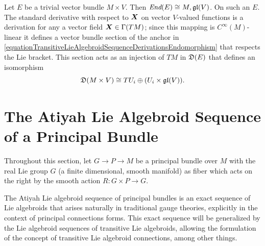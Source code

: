 \begin{example}
\label{exampleDerivationsLieAlgebroidOfATrivialVectorBundleglV}
Let $E$ be a trivial vector bundle $M \times V$. Then $\operatorname{\textit{End}}(E) \cong M, \mathfrak{gl}(V)$. On such an $E$. The standard derivative with respect to $\bm{X}$ on vector $V$-valued functions is a derivation for any a vector field $\bm{X} \in \Gamma(TM)$; since this mapping is $C^\infty(M)$-linear it defines a vector bundle section of the anchor in \ref{equationTransitiveLieAlgebroidSequenceDerivationsEndomorphism} that respects the Lie bracket. This section acts as an injection of $TM$ in $\mathfrak{D}(E)$ that defines an isomorphism
\begin{equation}
    \mathfrak{D}(M \times V) \cong TU_i \oplus (U_i \times \mathfrak{gl}(V)).
\end{equation}
\end{example}







\section{The Atiyah Lie Algebroid Sequence of a Principal Bundle}

Throughout this section, let $G \to P \to M$ be a principal bundle over $M$ with the real Lie group $G$ (a finite dimensional, smooth manifold) as fiber which acts on the right by the smooth action $R: G \times P \to G$.

The Atiyah Lie algebroid sequence of principal bundles is an exact sequence of Lie algebroids that arises naturally in traditional gauge theories, explicitly in the context of principal connections forms. This exact sequence will be generalized by the Lie algebroid sequences of transitive Lie algebroids, allowing the formulation of the concept of transitive Lie algebroid connections, among other things.

